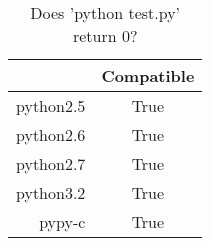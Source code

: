 \begin{table}[ht]
	\begin{center}
	\caption{Does 'python test.py' return 0?}
	\label{tab:compatibleTable}
		\begin{tabular}{rc}
		\toprule
			 & Compatible\\
			\midrule
			python2.5 & True\\
			python2.6 & True\\
			python2.7 & True\\
			python3.2 & True\\
			pypy-c & True\\
		\bottomrule
		\end{tabular}
	\end{center}
\end{table}